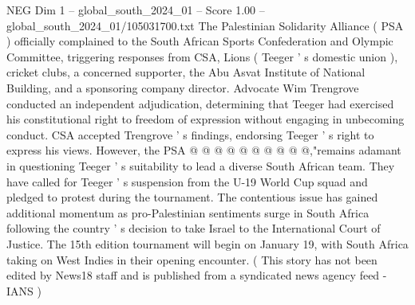 \begin{textsample}{NEG Dim 1 – global\_south\_2024\_01 – Score 1.00 – global\_south\_2024\_01/105031700.txt}
The Palestinian Solidarity Alliance ( PSA ) officially complained to the South African Sports Confederation and Olympic Committee, triggering responses from CSA, Lions ( Teeger ' s domestic union ), cricket clubs, a concerned supporter, the Abu Asvat Institute of National Building, and a sponsoring company director.
Advocate Wim Trengrove conducted an independent adjudication, determining that Teeger had exercised his constitutional right to freedom of expression without engaging in unbecoming conduct.
CSA accepted Trengrove ' s findings, endorsing Teeger ' s right to express his views.
However, the PSA @ @ @ @ @ @ @ @ @ @,"remains adamant in questioning Teeger ' s suitability to lead a diverse South African team.
They have called for Teeger ' s suspension from the U-19 World Cup squad and pledged to protest during the tournament.
The contentious issue has gained additional momentum as pro-Palestinian sentiments surge in South Africa following the country ' s decision to take Israel to the International Court of Justice.
The 15th edition tournament will begin on January 19, with South Africa taking on West Indies in their opening encounter. ( This story has not been edited by News18 staff and is published from a syndicated news agency feed - IANS )

\end{textsample}
